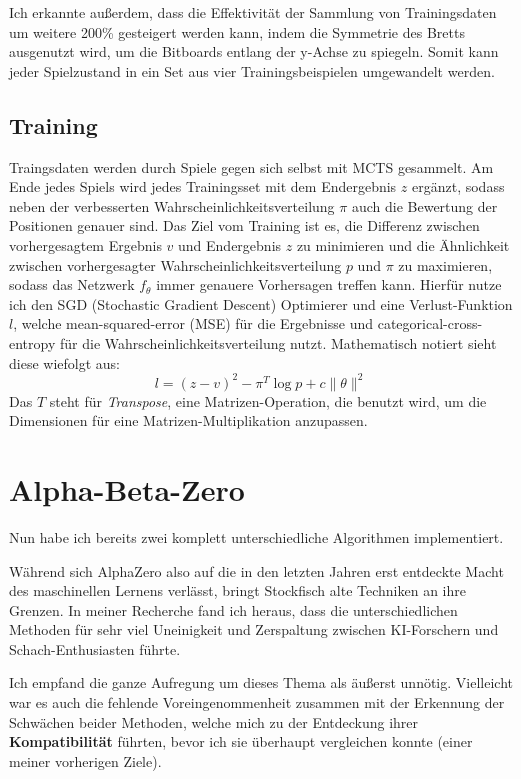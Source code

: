 \documentclass{jpp}
\begin{document}
Ich erkannte außerdem, dass die Effektivität der Sammlung von Trainingsdaten um weitere 200\% gesteigert werden kann, indem die Symmetrie des Bretts ausgenutzt wird, um die Bitboards entlang der y-Achse zu spiegeln. Somit kann jeder Spielzustand in ein Set aus vier Trainingsbeispielen umgewandelt werden.


\subsection{Training}
Traingsdaten werden durch Spiele gegen sich selbst mit MCTS gesammelt. Am Ende jedes Spiels wird jedes Trainingsset mit dem Endergebnis $z$ ergänzt, sodass neben der verbesserten Wahrscheinlichkeitsverteilung $\pi$ auch die Bewertung der Positionen genauer sind. Das Ziel vom Training ist es, die Differenz zwischen vorhergesagtem Ergebnis $v$ und Endergebnis $z$ zu minimieren und die Ähnlichkeit zwischen vorhergesagter Wahrscheinlichkeitsverteilung $p$ und $\pi$ zu maximieren, sodass das Netzwerk $f_\theta$ immer genauere Vorhersagen treffen kann.
Hierfür nutze ich den SGD (Stochastic Gradient Descent) Optimierer und eine Verlust-Funktion $l$, welche mean-squared-error (MSE) für die Ergebnisse und categorical-cross-entropy für die Wahrscheinlichkeitsverteilung nutzt. Mathematisch notiert sieht diese wiefolgt aus:
\[
l = (z - v)^2 - \pi^T \log p + c\lVert \theta \rVert^2
\]
Das $T$ steht für \textit{Transpose}, eine Matrizen-Operation, die benutzt wird, um die Dimensionen für eine Matrizen-Multiplikation anzupassen.

\section{Alpha-Beta-Zero}
Nun habe ich bereits zwei komplett unterschiedliche Algorithmen implementiert.

Während sich AlphaZero also auf die in den letzten Jahren erst entdeckte Macht des maschinellen Lernens verlässt, bringt Stockfisch alte Techniken an ihre Grenzen. In meiner Recherche fand ich heraus, dass die unterschiedlichen Methoden für sehr viel Uneinigkeit und Zerspaltung zwischen KI-Forschern und Schach-Enthusiasten führte.

Ich empfand die ganze Aufregung um dieses Thema als äußerst unnötig. Vielleicht war es auch die fehlende Voreingenommenheit zusammen mit der Erkennung der Schwächen beider Methoden, welche mich zu der Entdeckung ihrer \textbf{Kompatibilität} führten, bevor ich sie überhaupt vergleichen konnte (einer meiner vorherigen Ziele).
\end{document}
